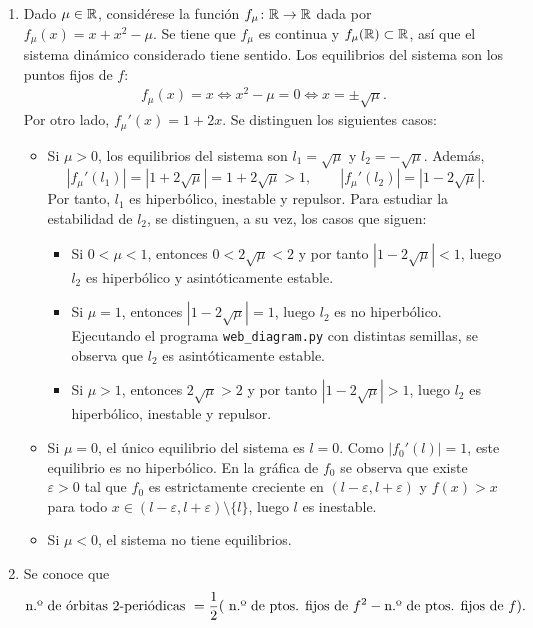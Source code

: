 \documentclass[11pt]{report}
\begin{document}
\begin{solution}
    \begin{enumerate}
        \item Dado $\mu\in\mathbb R$, considérese la función $f_\mu\colon\mathbb R\to\mathbb R$ dada por $f_\mu(x) = x+x^2-\mu$. Se tiene que $f_\mu$ es continua y $f_\mu(\mathbb R)\subset\mathbb R$, así que el sistema dinámico considerado tiene sentido. Los equilibrios del sistema son los puntos fijos de $f$:
        \begin{align*}
            f_\mu(x) = x \iff x^2-\mu = 0 \iff x = \pm\sqrt{\mu}.
        \end{align*}
        Por otro lado, $f_\mu'(x) = 1+2x$. Se distinguen los siguientes casos:
        \begin{itemize}
            \item Si $\mu > 0$, los equilibrios del sistema son $l_1 = \sqrt{\mu}$ y $l_2 = -\sqrt{\mu}$. Además, \[|f_\mu'(l_1)| = |1+2\sqrt{\mu}| = 1+2\sqrt{\mu} > 1, \qquad |f_\mu'(l_2)| = |1-2\sqrt{\mu}|.\] Por tanto, $l_1$ es hiperbólico, inestable y repulsor. Para estudiar la estabilidad de $l_2$, se distinguen, a su vez, los casos que siguen:
            \begin{itemize}
                \item Si $0<\mu<1$, entonces $0<2\sqrt{\mu}<2$ y por tanto $|1-2\sqrt{\mu}|<1$, luego $l_2$ es hiperbólico y asintóticamente estable.
                \item Si $\mu=1$, entonces $|1-2\sqrt{\mu}|=1$, luego $l_2$ es no hiperbólico. Ejecutando el programa \texttt{web\_diagram.py} con distintas semillas, se observa que $l_2$ es asintóticamente estable.
                \item Si $\mu > 1$, entonces $2\sqrt{\mu}>2$ y por tanto $|1-2\sqrt{\mu}|>1$, luego $l_2$ es hiperbólico, inestable y repulsor.
            \end{itemize} 
            \item Si $\mu = 0$, el único equilibrio del sistema es $l = 0$. Como $|f_0'(l)| = 1$, este equilibrio es no hiperbólico. En la gráfica de $f_0$ se observa que existe $\varepsilon>0$ tal que $f_0$ es estrictamente creciente en $(l-\varepsilon,l+\varepsilon)$ y $f(x)>x$ para todo $x \in (l-\varepsilon,l+\varepsilon)\setminus\{l\}$, luego $l$ es inestable.
            \item Si $\mu < 0$, el sistema no tiene equilibrios.
        \end{itemize}
        \item Se conoce que
        \[\textup{n.º de órbitas } 2 \textup{-periódicas } = \frac{1}{2}(\textup{ n.º de ptos. fijos de } f^2 - \textup{n.º de ptos. fijos de } f).\]

\end{enumerate}
\end{solution}
\end{document}

